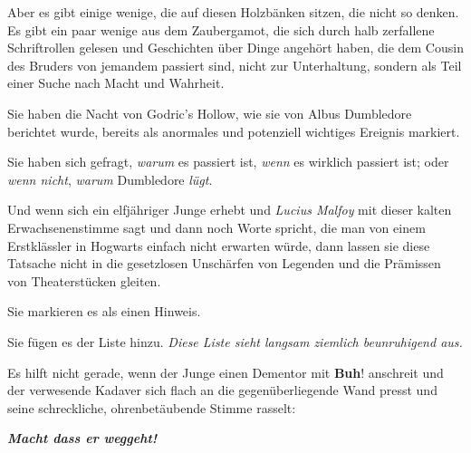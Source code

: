 Aber es gibt einige wenige, die auf diesen Holzbänken sitzen, die nicht so
denken. Es gibt ein paar wenige aus dem Zaubergamot, die sich durch halb
zerfallene Schriftrollen gelesen und Geschichten über Dinge angehört haben, die
dem Cousin des Bruders von jemandem passiert sind, nicht zur Unterhaltung,
sondern als Teil einer Suche nach Macht und Wahrheit.

Sie haben die Nacht von Godric's Hollow, wie sie von Albus Dumbledore berichtet
wurde, bereits als anormales und potenziell wichtiges Ereignis markiert.

Sie haben sich gefragt, \emph{warum} es passiert ist, \emph{wenn} es wirklich
passiert ist; oder \emph{wenn nicht}, \emph{warum} Dumbledore \emph{lügt}.

Und wenn sich ein elfjähriger Junge erhebt und \emph{\glqq{}Lucius Malfoy\grqq{}
} mit dieser kalten Erwachsenenstimme sagt und dann noch Worte spricht, die man
von einem Erstklässler in Hogwarts einfach nicht erwarten würde, dann lassen sie
diese Tatsache nicht in die gesetzlosen Unschärfen von Legenden und die
Prämissen von Theaterstücken gleiten.

Sie markieren es als einen Hinweis.


Sie fügen es der Liste hinzu. \emph{Diese Liste sieht langsam ziemlich
beunruhigend aus.}


Es hilft nicht gerade, wenn der Junge einen Dementor mit \glqq{}
\textbf{Buh}!\grqq{} anschreit und der verwesende Kadaver sich flach an die
gegenüberliegende Wand presst und seine schreckliche, ohrenbetäubende Stimme
rasselt:

\textbf{\emph{\glqq{}Macht dass er
weggeht!\grqq{}} }

